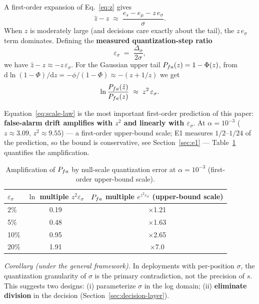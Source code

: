 A first-order expansion of Eq.~\eqref{eq:z} gives
\begin{equation}
\hat{z}-z \;\approx\; \frac{e_s-e_\mu-z\,e_\sigma}{\sigma}.
\label{eq:first-order}
\end{equation}
When $z$ is moderately large (and decisions care exactly about the tail), the $z\,e_\sigma$ term dominates.
Defining the \textbf{measured quantization-step ratio}
\begin{equation}
\varepsilon_\sigma \;=\; \frac{\Delta_\sigma}{2\sigma},
\label{eq:eps-sigma}
\end{equation}
we have $\hat z-z\approx -z\,\varepsilon_\sigma$.
For the Gaussian upper tail $P_{fa}(z)=1-\Phi(z)$, from $\mathrm{d}\ln(1-\Phi)/\mathrm{d}z=-\phi/(1-\Phi)\approx-(z+1/z)$ we get
\begin{equation}
\ln\frac{P_{fa}(\hat z)}{P_{fa}(z)} \;\approx\; z^{2}\,\varepsilon_\sigma .
\label{eq:scale-law}
\end{equation}

Equation~\eqref{eq:scale-law} is the most important first-order prediction of this paper: \textbf{false-alarm drift amplifies with $z^2$ and linearly with $\varepsilon_\sigma$}.
At $\alpha=10^{-3}$ ($z\approx 3.09$, $z^2\approx 9.55$) --- a first-order upper-bound scale; E1 measures $1/2$--$1/24$ of the prediction, so the bound is conservative, see Section~\ref{sec:e1} --- Table~\ref{tab:eps-scan} quantifies the amplification.

\begin{table}[htbp]
\centering
\caption{Amplification of $P_{fa}$ by null-scale quantization error at $\alpha=10^{-3}$ (first-order upper-bound scale).}
\label{tab:eps-scan}
\small
\begin{tabular}{lcc}
\toprule
$\varepsilon_\sigma$ & $\ln$ multiple $z^2\varepsilon_\sigma$ & $P_{fa}$ multiple $e^{z^2\varepsilon_\sigma}$ (upper-bound scale) \\
\midrule
2\%  & 0.19 & $\times$1.21 \\
5\%  & 0.48 & $\times$1.63 \\
10\% & 0.95 & $\times$2.65 \\
20\% & 1.91 & $\times$7.0 \\
\bottomrule
\end{tabular}
\end{table}

\emph{Corollary (under the general framework).} In deployments with per-position $\sigma$, the quantization granularity of $\sigma$ is the primary contradiction, not the precision of $s$.
This suggests two designs: (i) parameterize $\sigma$ in the log domain; (ii) \textbf{eliminate division} in the decision (Section~\ref{sec:decision-layer}).

